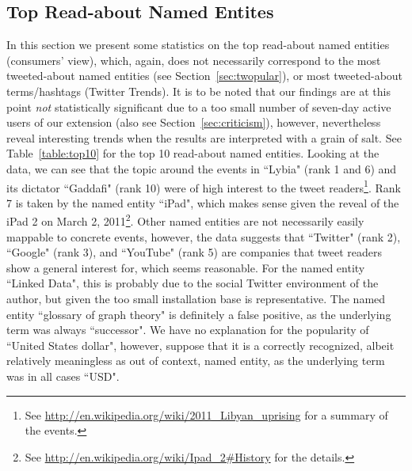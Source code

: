\documentclass[runningheads,a4paper]{llncs}
\begin{document}
\subsection{Top Read-about Named Entites}
In this section we present some statistics on the top read-about named entities (consumers' view), which, again, does not necessarily correspond to the most tweeted-about named entities (see Section~\ref{sec:twopular}), or most tweeted-about terms/hashtags (Twitter Trends). It is to be noted that our findings are at this point \textit{not} statistically significant due to a too small number of seven-day active users of our extension (also see Section~\ref{sec:criticism}), however, nevertheless reveal interesting trends when the results are interpreted with a grain of salt. See Table~\ref{table:top10} for the top 10 read-about named entities. Looking at the data, we can see that the topic around the events in ``Lybia" (rank 1 and 6) and its dictator ``Gaddafi" (rank 10) were of high interest to the tweet readers\footnote{See \url{http://en.wikipedia.org/wiki/2011_Libyan_uprising} for a summary of the events.}. Rank 7 is taken by the named entity ``iPad", which makes sense given the reveal of the iPad 2 on March 2, 2011\footnote{See \url{http://en.wikipedia.org/wiki/Ipad_2#History} for the details.}. Other named entities are not necessarily easily mappable to concrete events, however, the data suggests that ``Twitter" (rank 2), ``Google" (rank 3), and ``YouTube" (rank 5) are companies that tweet readers show a general interest for, which seems reasonable. For the named entity ``Linked Data", this is probably due to the social Twitter environment of the author, but given the too small installation base is representative. The named entity ``glossary of graph theory" is definitely a false positive, as the underlying term was always ``successor". We have no explanation for the popularity of ``United States dollar", however, suppose that it is a correctly recognized, albeit relatively meaningless as out of context, named entity, as the underlying term was in all cases ``USD".
\end{document}
